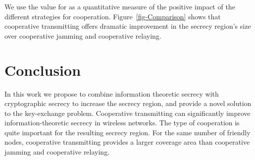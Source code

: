 \documentclass[conference,a4paper]{IEEEtran}
\begin{document}
We use the value for  as a quantitative measure of the positive impact of the different strategies for cooperation.
Figure~\ref{fig-Comparison} shows that cooperative transmitting offers dramatic improvement in the secrecy region's size over cooperative jamming and cooperative relaying.



\section{Conclusion} \label{sect:conclusion}
In this work we propose to combine information theoretic secrecy with cryptographic secrecy to increase the secrecy region, and provide a novel solution to the key-exchange problem. 
Cooperative transmitting can significantly improve information-theoretic secrecy in wireless networks.
The type of cooperation is quite important for the resulting secrecy region.
For the same number of friendly nodes, cooperative transmitting provides a  larger coverage area than cooperative jamming and cooperative relaying.













\end{document}
